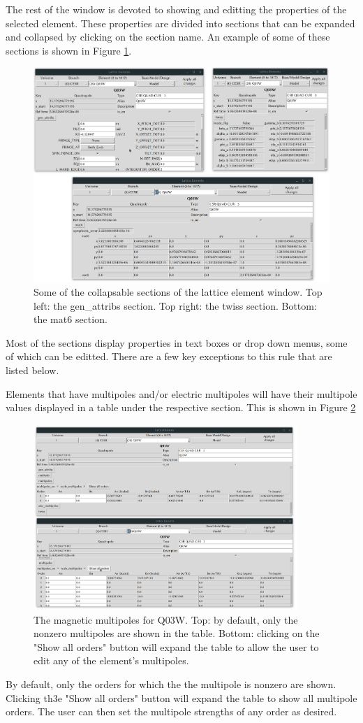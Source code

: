 The rest of the window is devoted to showing and editting the properties of the selected element.
These properties are divided into sections that can be expanded and collapsed by clicking on the section name.
An example of some of these sections is shown in Figure \ref{fig:gui.lat.element.2}.
\begin{figure}
\centering
\includegraphics[width=12cm]{figures/lat_element_2.png}
\caption{Some of the collapsable sections of the lattice element window.
Top left: the gen_attribs section.
Top right: the twiss section.
Bottom: the mat6 section.}
\label{fig:gui.lat.element.2}
\end{figure}
Most of the sections display properties in text boxes or drop down menus, some of which can be editted.
There are a few key exceptions to this rule that are listed below.

Elements that have multipoles and/or electric multipoles will have their multipole values displayed in a table under the respective section.
This is shown in Figure \ref{fig:gui.lat.element.multipoles}
\begin{figure}
\centering
\includegraphics[width=10cm]{figures/lat_element_multipoles.png}
\caption{The magnetic multipoles for Q03W.
Top: by default, only the nonzero multipoles are shown in the table.
Bottom: clicking on the "Show all orders" button will expand the table to allow the user to edit any of the element's multipoles.}
\label{fig:gui.lat.element.multipoles}
\end{figure}
By default, only the orders for which the the multipole is nonzero are shown.
Clicking th3e "Show all orders" button will expand the table to show all multipole orders.
The user can then set the multipole strengths of any order as desired.

